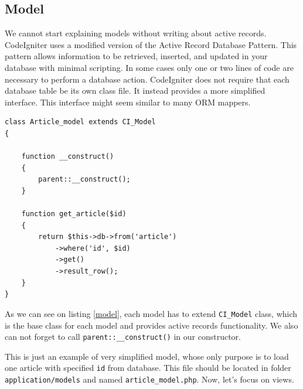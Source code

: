 \subsection{Model}


We cannot start explaining models without writing about active records. CodeIgniter uses a modified version of the Active Record Database Pattern. This pattern allows information to be retrieved, inserted, and updated in your database with minimal scripting. In some cases only one or two lines of code are necessary to perform a database action. CodeIgniter does not require that each database table be its own class file. It instead provides a more simplified interface. \cite{codeigniter} This interface might seem similar to many ORM mappers.



\begin{lstlisting}[label={model}, caption={Article model}]
class Article_model extends CI_Model
{

    function __construct()
    {
        parent::__construct();
    }

    function get_article($id)
    {
        return $this->db->from('article')
            ->where('id', $id)
            ->get()
            ->result_row();
    }
}
\end{lstlisting}



As we can see on listing \ref{model}, each model has to extend \texttt{CI\_Model} class, which is the base class for each model and provides active records functionality. We also can not forget to call \texttt{parent::\_\_construct()} in our constructor.


This is just an example of very simplified model, whose only purpose is to load one article with specified \texttt{id} from database. This file should be located in folder \texttt{application/models} and named \texttt{article\_model.php}.   Now, let's focus on views.

